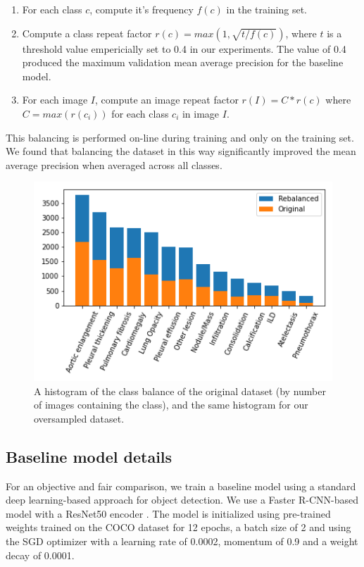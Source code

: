 \documentclass[conference]{IEEEtran}
\begin{document}
\begin{enumerate}
\item For each class $c$, compute it's frequency $f(c)$ in the training set.
\item Compute a class repeat factor $r(c) = max(1, \sqrt{{t}/{f(c)}})$, where $t$ is a threshold value empericially set to 0.4 in our experiments. The value of 0.4 produced the maximum validation mean average precision for the baseline model.
\item For each image $I$, compute an image repeat factor $r(I) = C * r(c)$ where $C = max(r(c_i))$ for each class $c_i$ in image $I$.
\end{enumerate}

This balancing is performed on-line during training and only on the training set. We found that balancing the dataset in this way significantly improved the mean average precision when averaged across all classes.

\begin{figure}[h]
\centering
\includegraphics[width=\columnwidth]{images/rebalace}
\caption{A histogram of the class balance of the original dataset (by number of images containing the class), and the same histogram for our oversampled dataset.}
\label{fig:class-balance}
\end{figure}

\subsection{Baseline model details}

For an objective and fair comparison, we train a baseline model using a standard deep learning-based approach for object detection. We use a Faster R-CNN-based model \cite{DBLP:conf/nips/RenHGS15} with a ResNet50 encoder \cite{He_2016_CVPR}. The model is initialized using pre-trained weights trained on the COCO dataset for 12 epochs, a batch size of 2 and using the SGD optimizer with a learning rate of 0.0002, momentum of 0.9 and a weight decay of 0.0001.
\end{document}

